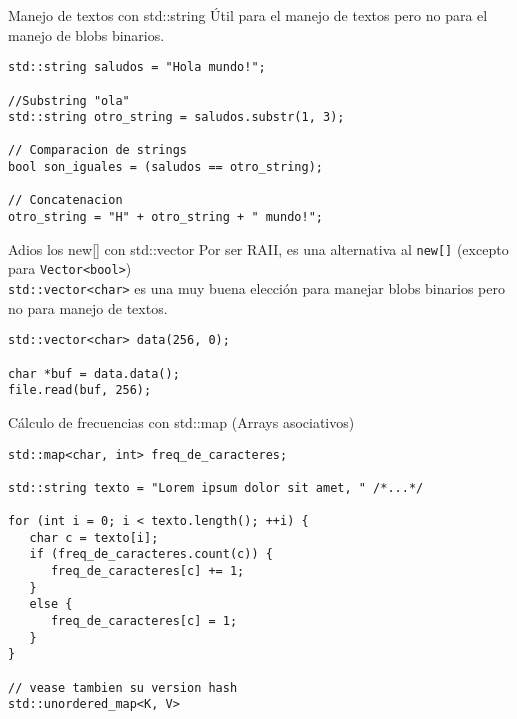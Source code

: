 \begin{frame}[fragile]{Manejo de textos con std::string}
\'Util para el manejo de textos pero no para el manejo de blobs binarios.
   \begin{lstlisting}[style=normal]
std::string saludos = "Hola mundo!";

//Substring "ola"
std::string otro_string = saludos.substr(1, 3);

// Comparacion de strings
bool son_iguales = (saludos == otro_string);

// Concatenacion
otro_string = "H" + otro_string + " mundo!";
   \end{lstlisting}
\end{frame}


\begin{frame}[fragile]{Adios los new[] con std::vector}
Por ser RAII, es una alternativa al \lstinline[style=normal]!new[]! (excepto para \lstinline[style=normal]!Vector<bool>!) \\
\lstinline[style=normal]!std::vector<char>! es una muy buena elecci\'on para manejar blobs binarios pero no para manejo de textos.
      \begin{lstlisting}[style=normal]
std::vector<char> data(256, 0);

char *buf = data.data();
file.read(buf, 256);
      \end{lstlisting}
\end{frame}


\begin{frame}[fragile]{C\'alculo de frecuencias con std::map (Arrays asociativos)}
   \begin{lstlisting}[style=normal]
std::map<char, int> freq_de_caracteres;

std::string texto = "Lorem ipsum dolor sit amet, " /*...*/

for (int i = 0; i < texto.length(); ++i) {
   char c = texto[i];
   if (freq_de_caracteres.count(c)) {
      freq_de_caracteres[c] += 1;
   }
   else {
      freq_de_caracteres[c] = 1;
   }
}

// vease tambien su version hash
std::unordered_map<K, V>
   \end{lstlisting}
\end{frame}


